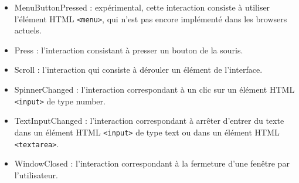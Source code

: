 \documentclass[11pt, a4paper, pdftex]{article}
\newcommand{\info}{\texttt}
\begin{document}
\begin{appendices}
\begin{itemize}
                \item MenuButtonPressed : expérimental, cette interaction consiste à utiliser l'élément HTML \info{<menu>}, qui n'est pas encore implémenté dans les browsers actuels.
                \item Press : l'interaction consistant à presser un bouton de la souris.
                \item Scroll : l'interaction qui consiste à dérouler un élément de l'interface.
                \item SpinnerChanged : l'interaction correspondant à un clic sur un élément HTML \info{<input>} de type number.
                \item TextInputChanged : l'interaction correspondant à arrêter d'entrer du texte dans un élément HTML \info{<input>} de type text ou dans un élément HTML \info{<textarea>}.
                \item WindowClosed : l'interaction correspondant à la fermeture d'une fenêtre par l'utilisateur.
            \end{itemize}

    \end{appendices}
\end{document}
